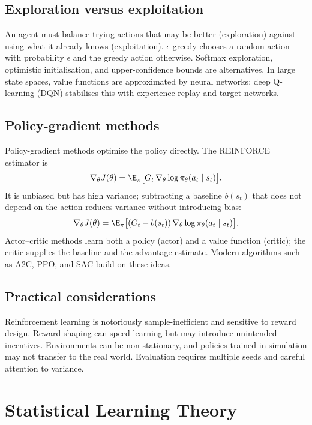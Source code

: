 \documentclass[a4paper, 12pt]{book}
\begin{document}
\section{Exploration versus exploitation}

An agent must balance trying actions that may be better (exploration) against using
what it already knows (exploitation). $\epsilon$-greedy chooses a random action with
probability $\epsilon$ and the greedy action otherwise. Softmax exploration, optimistic
initialisation, and upper-confidence bounds are alternatives. In large state spaces,
value functions are approximated by neural networks; deep Q-learning (DQN) stabilises
this with experience replay and target networks.

\section{Policy-gradient methods}

Policy-gradient methods optimise the policy directly. The REINFORCE estimator is
\begin{align}
    \nabla_\theta J(\theta)
    = \E_\pi\big[G_t\,\nabla_\theta\log\pi_\theta(a_t\mid s_t)\big].
\end{align}
It is unbiased but has high variance; subtracting a baseline $b(s_t)$ that does not
depend on the action reduces variance without introducing bias:
\begin{align}
    \nabla_\theta J(\theta)
    = \E_\pi\big[(G_t-b(s_t))\,
      \nabla_\theta\log\pi_\theta(a_t\mid s_t)\big].
\end{align}
Actor--critic methods learn both a policy (actor) and a value function (critic); the
critic supplies the baseline and the advantage estimate. Modern algorithms such as
A2C, PPO, and SAC build on these ideas.

\section{Practical considerations}

Reinforcement learning is notoriously sample-inefficient and sensitive to reward
design. Reward shaping can speed learning but may introduce unintended incentives.
Environments can be non-stationary, and policies trained in simulation may not
transfer to the real world. Evaluation requires multiple seeds and careful attention
to variance.


\chapter{Statistical Learning Theory}
\label{ch:slt}
\end{document}
